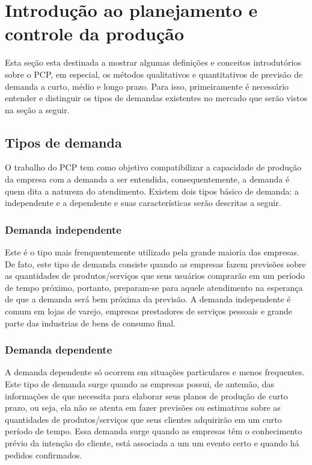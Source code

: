 \chapter{Introdução ao planejamento e controle da produção}
\label{chap:introducao_ao_planejamento}

Esta seção esta destinada a mostrar algumas definições e conceitos introdutórios sobre o \ac{PCP}, em especial, os métodos qualitativos e quantitativos de previsão de demanda a curto, médio e longo prazo. Para isso, primeiramente é necessário entender e distinguir os tipos de demandas existentes no mercado que serão vistos na seção a seguir.

\section{Tipos de demanda}
\label{sec:introducao_ao_planejamento_sec1}

O trabalho do PCP tem como objetivo compatibilizar a capacidade de produção da empresa com a demanda a ser entendida, consequentemente, a demanda é quem dita a natureza do atendimento. Existem dois tipos básico de demanda: a independente e a dependente e suas características serão descritas a seguir.

\subsection{Demanda independente}

Este é o tipo mais frenquentemente utilizado pela grande maioria das empresas. De fato, este tipo de demanda consiste quando as empresas fazem previsões sobre as quantidades de produtos/serviços que seus usuários comprarão em um período de tempo próximo, portanto, preparam-se para aquele atendimento na esperança de que a demanda será bem próxima da previsão. A demanda independente é comum em lojas de varejo, empresas prestadores de serviços pessoais e grande parte das industrias de bens de consumo final.

\subsection{Demanda dependente}

A demanda dependente só ocorrem em situações particulares e menos frequentes. Este tipo de demanda surge quando as empresas possui, de antemão, das informações de que necessita para elaborar seus planos de produção de curto prazo, ou seja, ela não se atenta em fazer previsões ou estimativas sobre as quantidades de produtos/serviços que seus clientes adquirirão em um curto período de tempo. Essa demanda surge quando as empresas têm o conhecimento prévio da intenção do cliente, está associada a um um evento certo e quando há pedidos confirmados.

